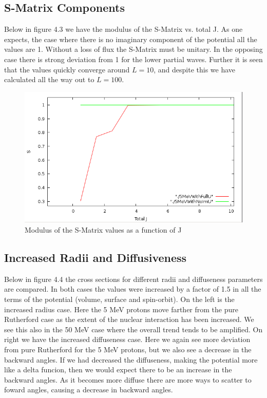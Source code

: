 \documentclass[paper=a4, fontsize=11pt]{scrartcl} %
\numberwithin{equation}{section} %
\numberwithin{figure}{section} %
\numberwithin{table}{section} %
\begin{document}
\subsection{S-Matrix Components}
Below in figure 4.3 we have the modulus of the S-Matrix vs. total J.  As one expects, the case where there is no imaginary component of the potential all the values are 1.  Without a loss of flux the S-Matrix must be unitary.  In the opposing case there is strong deviation from 1 for the lower partial waves.  Further it is seen that the values quickly converge around $L=10$, and despite this we have calculated all the way out to $L=100$.
\begin{figure}[hbt]
        \centering
	\includegraphics[width=.4\textwidth]{SMatrixV_J.PNG}
 \caption{Modulus of the S-Matrix values as a function of J}	
\end{figure}


\subsection{Increased Radii and Diffusiveness}

Below in figure 4.4 the cross sections for different radii and diffuseness parameters are compared.  In both cases the values were increased by a factor of 1.5 in all the terms of the potential (volume, surface and spin-orbit).  On the left is the increased radius case.  Here the 5 MeV protons move farther from the pure Rutherford case as the extent of the nuclear interaction has been increased.  We see this also in the 50 MeV case where the overall trend tends to be amplified.  On right we have the increased diffuseness case.  Here we again see more deviation from pure Rutherford for the 5 MeV protons, but we also see a decrease in the backward angles.  If we had decreased the diffuseness, making the potential more like a delta funcion, then we would expect there to be an increase in the backward angles.  As it becomes more diffuse there are more ways to scatter to foward angles, causing a decrease in backward angles.
\end{document}
